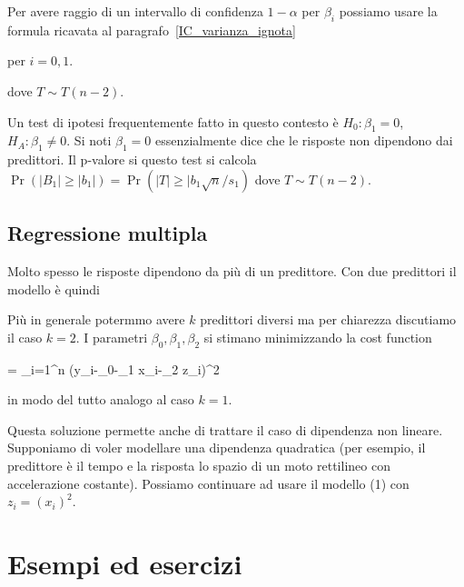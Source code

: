\documentclass[11pt,openany]{book}
\def\epsilon{\varepsilon}
\begin{document}
Per avere raggio di un intervallo di confidenza $1-\alpha$ per $\beta_i$ possiamo usare la formula ricavata al paragrafo~\ref{IC_varianza_ignota} 

\ceq{\hfill 1-\alpha}{=}{\Pr\bigg(-\frac{\epsilon}{s_i/\sqrt{n}}<T<\frac{\epsilon}{s_i/\sqrt{n}}\bigg)}\qquad per $i=0,1$.

dove $T\sim T(n-2)$.

Un test di ipotesi frequentemente fatto in questo contesto è $H_0:\beta_1=0$, $H_A:\beta_1\neq0$.
Si noti $\beta_1=0$ essenzialmente dice che le risposte non dipendono dai predittori.
Il p-valore si questo test si calcola $\Pr(|B_1|\ge |b_1|)=\Pr(|T|\ge |b_1\sqrt{n}/s_1)$ dove $T\sim T(n-2)$.


\clearpage\section{Regressione multipla}
\label{regressione_lineare4}

Molto spesso le risposte dipendono da più di un predittore.
Con due predittori il modello è quindi


Più in generale potermmo avere $k$ predittori diversi ma per chiarezza discutiamo il caso $k=2$.
I parametri $\beta_0,\beta_1,\beta_2$ si stimano minimizzando la cost function

{=}
{\sum_{i=1}^n (y_i-\beta_0-\beta_1 x_i-\beta_2 z_i)^2}

in modo del tutto analogo al caso $k=1$.

Questa soluzione permette anche di trattare il caso di dipendenza non lineare.
Supponiamo di voler modellare una dipendenza quadratica (per esempio, il predittore è il tempo e la risposta lo spazio di un moto rettilineo con accelerazione costante).
Possiamo continuare ad usare il modello (1) con $z_i=(x_i)^2$.



\chapter{Esempi ed esercizi}
\pagestyle{plain}
\label{ch2}
\end{document}
